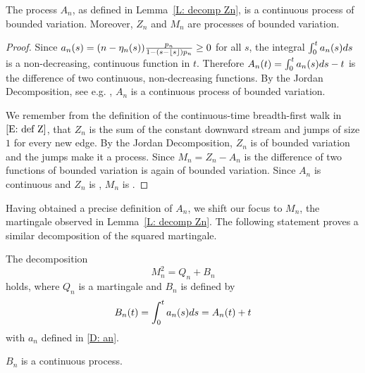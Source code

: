 \begin{corollary}
	The process $A_n$, as defined in Lemma~\ref{L: decomp Zn}, is a continuous process of bounded variation.
	Moreover, $Z_n$ and $M_n$ are \cadlaq{} processes of bounded variation.
\end{corollary}

\begin{proof}
	Since $a_n(s) = (n - \eta_n(s)) \frac{p_n}{1-(s-\lfloor s\rfloor)p_n} \geq 0$ for all $s$,
	the integral $\int_{0}^{t}a_n(s)ds$ is a non-decreasing, continuous function in $t$.
	Therefore $A_n(t) = \int_{0}^{t}a_n(s)ds -t$ is the difference of two continuous, non-decreasing functions.
	By the Jordan Decomposition, see e.g. \cite{Mikosch2009}, $A_n$ is a continuous process of bounded variation.
	
	We remember from the definition of the continuous-time breadth-first walk in $\eqref{E: def Z}$,
	that $Z_n$ is the sum of the constant downward stream and jumps of size $1$ for every new edge.
	By the Jordan Decomposition, $Z_n$ is of bounded variation and the jumps make it a \cadlaq{} process.
	Since $M_n = Z_n - A_n$ is the difference of two functions of bounded variation is again of bounded variation.
	Since $A_n$ is continuous and $Z_n$ is \cadlaq{}, $M_n$ is \cadlaq{}.
\end{proof}



Having obtained a precise definition of $A_n$, we shift our focus to $M_n$, the martingale observed in Lemma~\ref{L: decomp Zn}.
The following statement proves a similar decomposition of the squared martingale.

\begin{lemma} \label{L: decomp Mn}
	The decomposition
	\begin{equation} \label{E: decomp Mn}
	M_n^2 = Q_n + B_n
	\end{equation}
	holds, where $Q_n$ is a martingale and $B_n$ is defined by 
	\begin{equation} \label{D: Bn}
	B_n(t) = \int_{0}^{t} a_n(s)ds = A_n(t) + t
	\end{equation}
	with $a_n$ defined in \eqref{D: an}.
\end{lemma}
\begin{note} \label{N: decomp Mn}
	$B_n$ is a continuous process.
\end{note}

